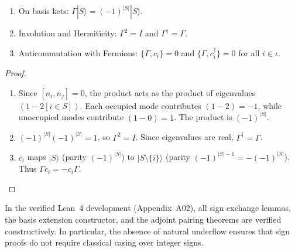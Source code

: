\begin{theorem}
\label{thm:app_parity_properties}
\begin{enumerate}
    \item On basis kets: $\Gamma |S\rangle = (-1)^{|S|} |S\rangle$.
    \item Involution and Hermiticity: $\Gamma^2 = I$ and $\Gamma^\dagger = \Gamma$.
    \item Anticommutation with Fermions: $\{\Gamma, c_i\} = 0$ and $\{\Gamma, c_i^\dagger\} = 0$ for all $i \in \iota$.
\end{enumerate}
\end{theorem}

\begin{proof}
\begin{enumerate}
    \item Since $[n_i, n_j] = 0$, the product acts as the product of eigenvalues $(1 - 2 [i \in S])$. Each occupied mode contributes $(1 - 2) = -1$, while unoccupied modes contribute $(1 - 0) = 1$. The product is $(-1)^{|S|}$.
    \item $(-1)^{|S|} (-1)^{|S|} = 1$, so $\Gamma^2 = I$. Since eigenvalues are real, $\Gamma^\dagger = \Gamma$.
    \item $c_i$ maps $|S\rangle$ (parity $(-1)^{|S|}$) to $|S \setminus \{i\}\rangle$ (parity $(-1)^{|S|-1} = -(-1)^{|S|}$). Thus $\Gamma c_i = - c_i \Gamma$.
\end{enumerate}
\end{proof}

\begin{remark}
In the verified Lean~4 development (Appendix~A02), all sign exchange lemmas, the basis extension constructor, and the adjoint pairing theorems are verified constructively. In particular, the absence of natural underflow ensures that sign proofs do not require classical casing over integer signs.
\end{remark}

